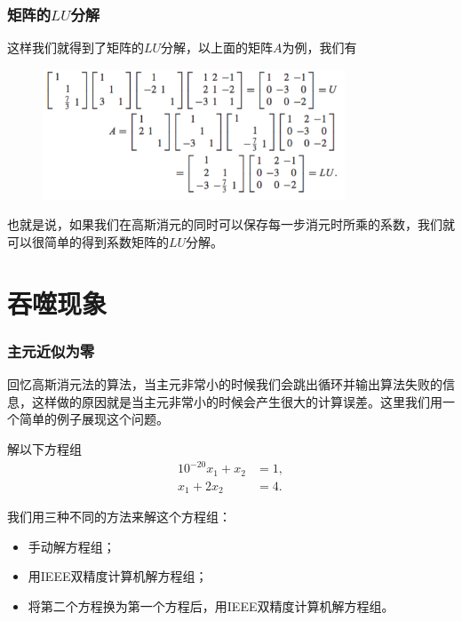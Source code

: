 \documentclass[10pt]{beamer}
\begin{document}
\begin{frame}
\frametitle{矩阵的$LU$分解}
这样我们就得到了矩阵的$LU$分解，以上面的矩阵$A$为例，我们有
\begin{figure}
\includegraphics[width=9cm]{figs/2_2_LU-8} 
\end{figure}
也就是说，如果我们在高斯消元的同时可以保存每一步消元时所乘的系数，我们就可以很简单的得到系数矩阵的$LU$分解。
\end{frame}


\section{吞噬现象}

\begin{frame}
\frametitle{主元近似为零}
回忆高斯消元法的算法，当主元非常小的时候我们会跳出循环并输出算法失败的信息，这样做的原因就是当主元非常小的时候会产生很大的计算误差。这里我们用一个简单的例子展现这个问题。
\begin{example}
解以下方程组
\begin{align}
10^{-20}x_1 + x_2 &= 1, \nonumber \\
x_1 + 2x_2 & = 4.
\end{align}
\end{example}

我们用三种不同的方法来解这个方程组：
\begin{itemize}
\item 手动解方程组；
\item 用IEEE双精度计算机解方程组；
\item 将第二个方程换为第一个方程后，用IEEE双精度计算机解方程组。
\end{itemize}
\end{frame}
\end{document}
